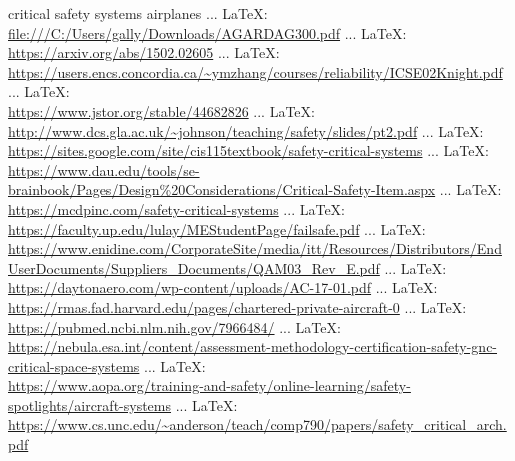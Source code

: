 \begin{thebibliography}{99}
{{{{{{{						
						critical safety systems airplanes
						 ... \LaTeX:\\ \url{file:///C:/Users/gally/Downloads/AGARDAG300.pdf}
						 ... \LaTeX:\\ \url{https://arxiv.org/abs/1502.02605}
						 ... \LaTeX:\\ \url{https://users.encs.concordia.ca/~ymzhang/courses/reliability/ICSE02Knight.pdf}
						 ... \LaTeX:\\ \url{https://www.jstor.org/stable/44682826}
						 ... \LaTeX:\\ \url{http://www.dcs.gla.ac.uk/~johnson/teaching/safety/slides/pt2.pdf}
						 ... \LaTeX:\\ \url{https://sites.google.com/site/cis115textbook/safety-critical-systems}
						 ... \LaTeX:\\ \url{https://www.dau.edu/tools/se-brainbook/Pages/Design%20Considerations/Critical-Safety-Item.aspx}
						 ... \LaTeX:\\ \url{https://mcdpinc.com/safety-critical-systems}
						 ... \LaTeX:\\ \url{https://faculty.up.edu/lulay/MEStudentPage/failsafe.pdf}
						 ... \LaTeX:\\ \url{https://www.enidine.com/CorporateSite/media/itt/Resources/Distributors/EndUserDocuments/Suppliers_Documents/QAM03_Rev_E.pdf}
						 ... \LaTeX:\\ \url{https://daytonaero.com/wp-content/uploads/AC-17-01.pdf}
						 ... \LaTeX:\\ \url{https://rmas.fad.harvard.edu/pages/chartered-private-aircraft-0}
						 ... \LaTeX:\\ \url{https://pubmed.ncbi.nlm.nih.gov/7966484/}
						 ... \LaTeX:\\ \url{https://nebula.esa.int/content/assessment-methodology-certification-safety-gnc-critical-space-systems}
						 ... \LaTeX:\\ \url{https://www.aopa.org/training-and-safety/online-learning/safety-spotlights/aircraft-systems}
						 ... \LaTeX:\\ \url{https://www.cs.unc.edu/~anderson/teach/comp790/papers/safety_critical_arch.pdf}
}}}}}}}
\end{thebibliography}
